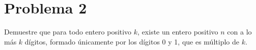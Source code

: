 
\section*{Problema 2}
Demuestre que para todo entero positivo $k$, existe un entero positivo $n$ con a lo más $k$ dígitos, formado únicamente por los dígitos 0 y 1, que es múltiplo de $k$.

